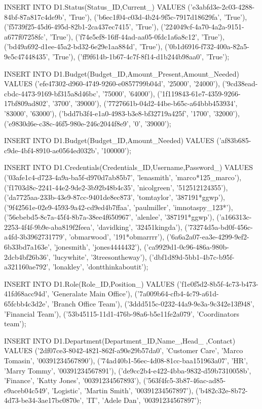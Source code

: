 INSERT INTO D1.Status(Status_ID,Current_) VALUES
('e3abfd3e-2c03-4288-84bf-87a817c4de9b', 'True'),
('b6ec1f04-c03d-4b24-9f5c-7917d18629fa', 'True'),
('f5739f25-45d6-495d-82b1-2ca437ec7415', 'True'),
('224049cf-4a70-4a2a-9151-a677f07258fc', 'True'),
('f74e5ef8-16ff-44ad-aa05-0fdc1a6a8c12', 'True'),
('bd49a692-d1ee-45a2-bd32-6e29e1aa884d', 'True'),
('0b1d6916-f732-400a-82a5-9e5c47448435', 'True'),
('ff9f614b-1b67-4c7f-8f14-d1b244b98aa0', 'True');

INSERT INTO D1.Budget(Budget_ID,Amount_Present,Amount_Needed) VALUES
('efe47302-d960-4749-9260-e0857799b04d', '25000', '24000'),
('9cd38ead-cbdc-4473-9169-bf315a8d46bc', '75000', '64000'),
('1f119843-61e7-4359-9266-17bf809ad802', '3700', '39000'),
('7727661b-04d2-44be-b65c-a64bbb453934', '83000', '63000'),
('bdd7b3f4-e1a0-4983-b3e8-bf32719a425f', '1700', '32000'),
('e9830d6e-c38c-46f5-980e-246c2044f8e9', '0', '39000');

INSERT INTO D1.Budget(Budget_ID,Amount_Needed) VALUES
('af83b685-c9de-4bf4-8910-ae0564ed032b', '100000');


INSERT INTO D1.Credentials(Credentials_ID,Username,Password_) VALUES
('03afe1c4-d723-4a9a-ba5f-d970d7ab85b7', 'lenasmith', 'marco*125_marco'),
('f1703d8c-2241-44e2-9de2-3b92b48b4c35', 'nicolgreen', '512512124355'),
('da7725aa-233b-43e9-87cc-9401de8ec873', 'tomtaylor', '387191*ggwp'),
('9f42561e-02e9-4593-9a42-cd9ed4b7ffaa', 'paulmiller', 'imnotaspy_123*'),
('56ebebd5-8c7a-45f4-8b7a-38ee4f650967', 'alenlee', '387191*ggwp'),
('a166313c-2253-4f4f-9b9e-aba819f2feea', 'davidking', '32451kingda'),
('73274d5a-bd0f-456c-a4fd-3b3962731779', 'obmarwood', '191*obmarrrr'),
('6a6a2a07-ea3e-4299-9ef2-6b33bd7a163e', 'jonesmith', 'jones4444432'),
('ca9929d1-0c96-486a-980b-2dcb4bf26b36', 'lucywhite', '3treesontheway'),
('dbf1d89d-5bb1-4b7c-b95f-a321160ae792', 'lonakley', 'dontthinkaboutit');


INSERT INTO D1.Role(Role_ID,Position_) VALUES
('f1e0f5d2-8b5f-4c73-b473-41fd68acc94d', 'Generalate Main Office'),
('7a009b64-cfb4-4c79-a61d-65fcbb4c3d2e', 'Branch Office Team'),
('3ddd515c-0232-44a9-9e3a-9c342e13f948', 'Financial Team'),
('53b45115-11d1-476b-98a6-b5e11fe2a079', 'Coordinators team');


INSERT INTO D1.Department(Department_ID,Name_,Head_ ,Contact) VALUES
('2df07ce3-8042-4821-862f-a90e29b57da0', 'Customer Care', 'Marco Tomasin', '00391234567890'),
('74ad40b1-56ec-4d08-81cc-baa151963a07', 'HR', 'Marry Tommy', '00391234567891'),
('de9cc2b4-e422-4bba-9832-d59b7310058b', 'Finance', 'Katty Jones', '00391234567893'),
('563f4fc5-3b87-46ac-ad85-e9aceb04c549', 'Logistic', 'Martin Smith', '00391234567897'),
('b482c32e-8b72-4d73-be34-3ae17bc0870e', 'IT', 'Adele Dan', '00391234567897');


